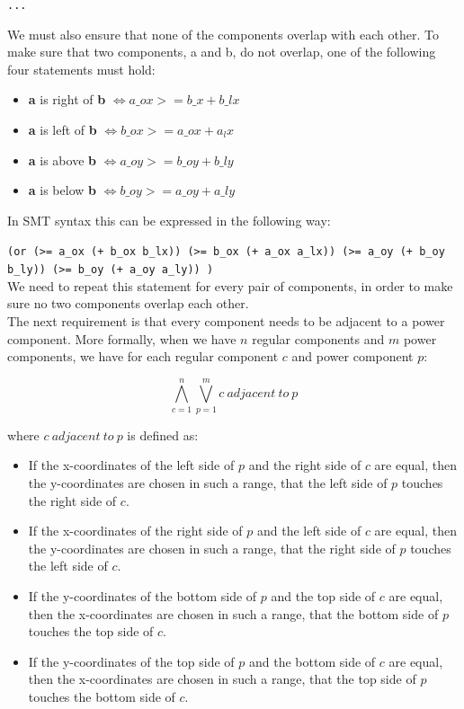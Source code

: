 \documentclass[a4paper]{article}
\begin{document}
	{\tt ...}
	
	\noindent We must also ensure that none of the components overlap with each other. To make sure that two components, a and b, do not overlap, one of the following four statements must hold:
	\begin{itemize}
		\item \textbf{a} is right of \textbf{b} $\Leftrightarrow a\_ox >= b\_x + b\_lx$
		\item \textbf{a} is left of \textbf{b} $\Leftrightarrow b\_ox >= a\_ox + a_lx$
		\item \textbf{a} is above \textbf{b} $\Leftrightarrow a\_oy >= b\_oy + b\_ly$
		\item \textbf{a} is below \textbf{b} $\Leftrightarrow b\_oy >= a\_oy + a\_ly$
	\end{itemize}
	In SMT syntax this can be expressed in the following way:
	
	{\tt (or (>= a\_ox (+ b\_ox b\_lx)) (>= b\_ox (+ a\_ox a\_lx)) (>= a\_oy (+ b\_oy b\_ly)) (>= b\_oy (+ a\_oy a\_ly)) )}\\
	\noindent We need to repeat this statement for every pair of components, in order to make sure no two components overlap each other.\\
	
	\noindent The next requirement is that every component needs to be adjacent to a power component. More formally, when we have $n$ regular components and $m$ power components, we have for each regular component $c$ and power component $p$:
	
	$$\bigwedge_{c=1}^n \bigvee_{p=1}^m c\ adjacent\ to\ p $$
	
	\noindent where $c\ adjacent\ to\ p $ is defined as:
	\begin{itemize}
	\item If the x-coordinates of the left side of $p$ and the right side of $c$ are equal, then the y-coordinates are chosen in such a range, that the left side of $p$ touches the right side of $c$.
	\item If the x-coordinates of the right side of $p$ and the left side of $c$ are equal, then the y-coordinates are chosen in such a range, that the right side of $p$ touches the left side of $c$.
	\item If the y-coordinates of the bottom side of $p$ and the top side of $c$ are equal, then the x-coordinates are chosen in such a range, that the bottom side of $p$ touches the top side of $c$.
	\item If the y-coordinates of the top side of $p$ and the bottom side of $c$ are equal, then the x-coordinates are chosen in such a range, that the top side of $p$ touches the bottom side of $c$.
	\end{itemize}
	
\end{document}
